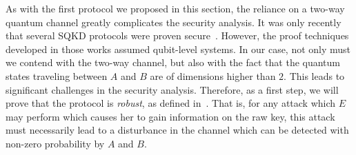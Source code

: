 As with the first protocol we proposed in this section, the reliance on a two-way quantum channel greatly complicates the security analysis.  It was only recently that several SQKD protocols were proven secure~\cite{krawec2015security,krawec2016security,krawec2016quantum,zha:qiu:mat:16}. However, the proof techniques developed in those works assumed qubit-level systems.  In our case, not only must we contend with the two-way channel, but also with the fact that the quantum states traveling between $A$ and $B$ are of dimensions higher than $2$.  This leads to significant challenges in the security analysis. Therefore, as a first step, we will prove that the protocol is \emph{robust}, as defined in~\cite{boy:ken:mor:07,boy:gel:ken:mor:09}. That is, for any attack which $E$ may perform which causes her to gain information on the raw key, this attack must necessarily lead to a disturbance in the channel which can be detected with non-zero probability by $A$ and $B$. 

